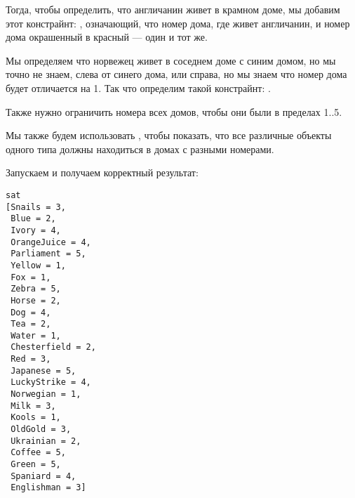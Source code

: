 Тогда, чтобы определить, что англичанин живет в крамном доме, мы добавим этот констрайнт: , означающий, что номер дома, где живет англичанин, и номер дома окрашенный в красный --- один и тот же.

Мы определяем что норвежец живет в соседнем доме с синим домом, но мы точно не знаем, слева от синего дома, или справа,
но мы знаем что номер дома будет отличается на 1.
Так что определим такой констрайнт: .

Также нужно ограничить номера всех домов, чтобы они были в пределах 1..5.

Мы также будем использовать , чтобы показать, что все различные объекты одного типа должны находиться в домах
с разными номерами.



Запускаем и получаем корректный результат:

\begin{lstlisting}
sat
[Snails = 3,
 Blue = 2,
 Ivory = 4,
 OrangeJuice = 4,
 Parliament = 5,
 Yellow = 1,
 Fox = 1,
 Zebra = 5,
 Horse = 2,
 Dog = 4,
 Tea = 2,
 Water = 1,
 Chesterfield = 2,
 Red = 3,
 Japanese = 5,
 LuckyStrike = 4,
 Norwegian = 1,
 Milk = 3,
 Kools = 1,
 OldGold = 3,
 Ukrainian = 2,
 Coffee = 5,
 Green = 5,
 Spaniard = 4,
 Englishman = 3]
 \end{lstlisting}

